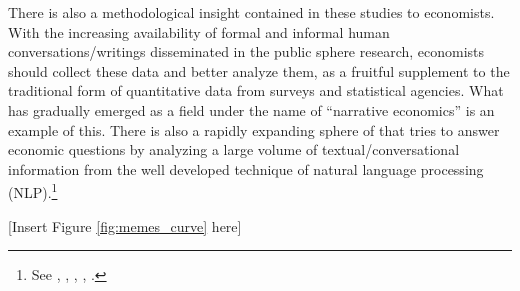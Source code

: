 
There is also a methodological insight contained in these studies to economists. With the increasing availability of formal and informal human conversations/writings disseminated in the public sphere research, economists should collect these data and better analyze them, as a fruitful supplement to the traditional form of quantitative data from surveys and statistical agencies. What has gradually emerged as a field under the name of ``narrative economics'' \citep{shiller1995conversation,shiller2017narrative} is an example of this. There is also a rapidly expanding sphere of that tries to answer economic questions by analyzing a large volume of textual/conversational information from the well developed technique of natural language processing (NLP).\footnote{See \cite{tetlock_giving_2007}, \cite{soo_quantifying_2015}, \cite{gentzkow2019text}, \cite{bybee2020structure}, \cite{ash2021text}.}
\begin{center}
			[Insert Figure \ref{fig:memes_curve} here]
\end{center}




